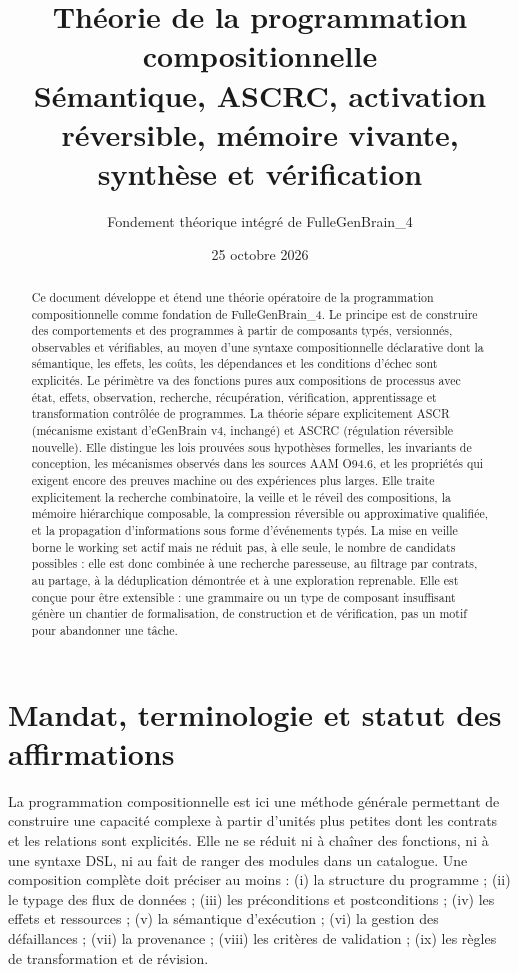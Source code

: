 \documentclass[11pt,a4paper]{article}
\title{Théorie de la programmation compositionnelle\\\large Sémantique, ASCRC, activation réversible, mémoire vivante, synthèse et vérification}
\author{Fondement théorique intégré de FulleGenBrain\_4}
\date{25 octobre 2026}
\theoremstyle{definition}
\theoremstyle{plain}
\theoremstyle{remark}
\begin{document}
\maketitle
\begin{abstract}
Ce document développe et étend une théorie opératoire de la programmation compositionnelle comme fondation de FulleGenBrain\_4. Le principe est de construire des comportements et des programmes à partir de composants typés, versionnés, observables et vérifiables, au moyen d'une syntaxe compositionnelle déclarative dont la sémantique, les effets, les coûts, les dépendances et les conditions d'échec sont explicités. Le périmètre va des fonctions pures aux compositions de processus avec état, effets, observation, recherche, récupération, vérification, apprentissage et transformation contrôlée de programmes. La théorie sépare explicitement ASCR (mécanisme existant d’eGenBrain v4, inchangé) et ASCRC (régulation réversible nouvelle). Elle distingue les lois prouvées sous hypothèses formelles, les invariants de conception, les mécanismes observés dans les sources AAM O94.6, et les propriétés qui exigent encore des preuves machine ou des expériences plus larges. Elle traite explicitement la recherche combinatoire, la veille et le réveil des compositions, la mémoire hiérarchique composable, la compression réversible ou approximative qualifiée, et la propagation d'informations sous forme d'événements typés. La mise en veille borne le working set actif mais ne réduit pas, à elle seule, le nombre de candidats possibles : elle est donc combinée à une recherche paresseuse, au filtrage par contrats, au partage, à la déduplication démontrée et à une exploration reprenable. Elle est conçue pour être extensible : une grammaire ou un type de composant insuffisant génère un chantier de formalisation, de construction et de vérification, pas un motif pour abandonner une tâche.
\end{abstract}
\newpage\setcounter{tocdepth}{1}\tableofcontents\newpage

\section{Mandat, terminologie et statut des affirmations}
La programmation compositionnelle est ici une méthode générale permettant de construire une capacité complexe à partir d'unités plus petites dont les contrats et les relations sont explicités. Elle ne se réduit ni à chaîner des fonctions, ni à une syntaxe DSL, ni au fait de ranger des modules dans un catalogue. Une composition complète doit préciser au moins : (i) la structure du programme ; (ii) le typage des flux de données ; (iii) les préconditions et postconditions ; (iv) les effets et ressources ; (v) la sémantique d'exécution ; (vi) la gestion des défaillances ; (vii) la provenance ; (viii) les critères de validation ; (ix) les règles de transformation et de révision.
\end{document}
